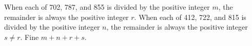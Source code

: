 When each of 702, 787, and 855 is divided by the positive integer $m$,  the remainder is always the positive integer $r$. When each of 412, 722, and 815 is divided by the positive integer $n$,  the remainder is always the positive integer $s \neq r$. Fine $m+n+r+s$.